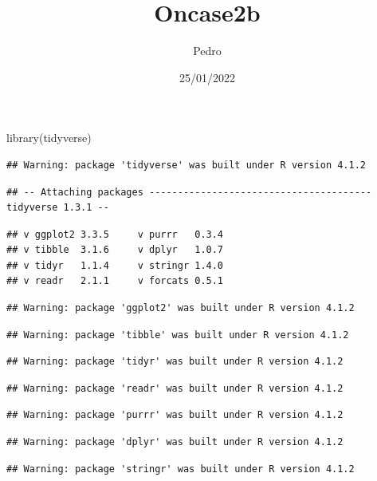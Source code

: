 \documentclass[
]{article}
\title{Oncase2b}
\author{Pedro}
\date{25/01/2022}
\newenvironment{Shaded}{\begin{snugshade}}{\end{snugshade}}
\newcommand{\FunctionTok}[1]{\textcolor[rgb]{0.00,0.00,0.00}{#1}}
\newcommand{\NormalTok}[1]{#1}
\begin{document}
\maketitle

\begin{Shaded}
\begin{Highlighting}[]
\FunctionTok{library}\NormalTok{(tidyverse)}
\end{Highlighting}
\end{Shaded}

\begin{verbatim}
## Warning: package 'tidyverse' was built under R version 4.1.2
\end{verbatim}

\begin{verbatim}
## -- Attaching packages --------------------------------------- tidyverse 1.3.1 --
\end{verbatim}

\begin{verbatim}
## v ggplot2 3.3.5     v purrr   0.3.4
## v tibble  3.1.6     v dplyr   1.0.7
## v tidyr   1.1.4     v stringr 1.4.0
## v readr   2.1.1     v forcats 0.5.1
\end{verbatim}

\begin{verbatim}
## Warning: package 'ggplot2' was built under R version 4.1.2
\end{verbatim}

\begin{verbatim}
## Warning: package 'tibble' was built under R version 4.1.2
\end{verbatim}

\begin{verbatim}
## Warning: package 'tidyr' was built under R version 4.1.2
\end{verbatim}

\begin{verbatim}
## Warning: package 'readr' was built under R version 4.1.2
\end{verbatim}

\begin{verbatim}
## Warning: package 'purrr' was built under R version 4.1.2
\end{verbatim}

\begin{verbatim}
## Warning: package 'dplyr' was built under R version 4.1.2
\end{verbatim}

\begin{verbatim}
## Warning: package 'stringr' was built under R version 4.1.2
\end{verbatim}
\end{document}
